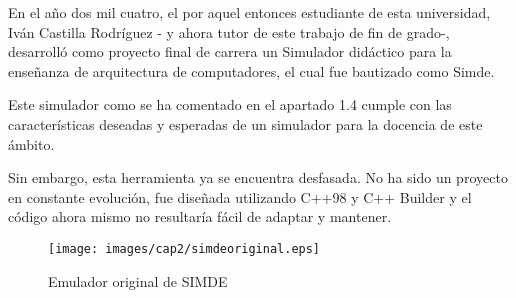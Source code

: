 En el año dos mil cuatro, el por aquel entonces estudiante de esta universidad, 
Iván Castilla Rodríguez - y ahora tutor de este trabajo de fin de grado-, 
desarrolló como proyecto final de carrera un Simulador didáctico para la enseñanza 
de arquitectura de computadores, el cual fue bautizado como Simde. 

\bigskip
Este simulador como se ha comentado en el apartado 1.4 cumple con las características
deseadas y esperadas de un simulador para la docencia de este ámbito.

\bigskip
Sin embargo, esta herramienta ya se encuentra desfasada. No ha sido un proyecto en constante
evolución, fue diseñada utilizando C++98 y C++ Builder y el código ahora mismo no resultaría
fácil de adaptar y mantener.

\begin{figure}[!th]
\begin{center}
\texttt{[image: images/cap2/simdeoriginal.eps]}
\caption{Emulador original de SIMDE}
\label{fig:Emulador original de SIMDE}
\end{center}
\end{figure}